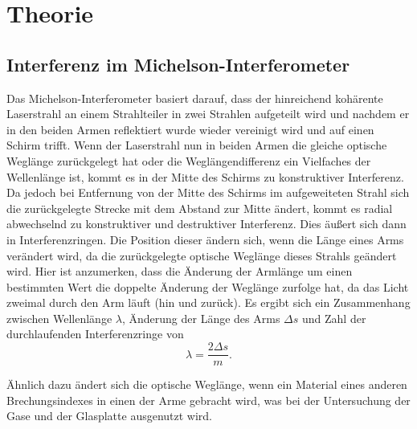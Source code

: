 \documentclass[
	a4paper,
	12pt,
	pagesize,
	ngerman
]{scrartcl}
\begin{document}
	\section{Theorie}
	\subsection{Interferenz im Michelson-Interferometer}
	Das Michelson-Interferometer basiert darauf, dass der hinreichend kohärente Laserstrahl an einem Strahlteiler in zwei Strahlen aufgeteilt wird und nachdem er in den beiden Armen reflektiert wurde wieder vereinigt wird und auf einen Schirm trifft.
	Wenn der Laserstrahl nun in beiden Armen die gleiche optische Weglänge zurückgelegt hat oder die Weglängendifferenz ein Vielfaches der Wellenlänge ist, kommt es in der Mitte des Schirms zu konstruktiver Interferenz.
	Da jedoch bei Entfernung von der Mitte des Schirms im aufgeweiteten Strahl sich die zurückgelegte Strecke mit dem Abstand zur Mitte ändert, kommt es radial abwechselnd zu konstruktiver und destruktiver Interferenz.
	Dies äußert sich dann in Interferenzringen.
	Die Position dieser ändern sich, wenn die Länge eines Arms verändert wird, da die zurückgelegte optische Weglänge dieses Strahls geändert wird.
	Hier ist anzumerken, dass die Änderung der Armlänge um einen bestimmten Wert die doppelte Änderung der Weglänge zurfolge hat, da das Licht zweimal durch den Arm läuft (hin und zurück).
	Es ergibt sich ein Zusammenhang zwischen Wellenlänge $\lambda$, Änderung der Länge des Arms $\Delta s$ und Zahl der durchlaufenden Interferenzringe von %
	\begin{equation}
		\lambda = \frac{2 \Delta s}{m}.
		\label{eq_wellenlaenge}
	\end{equation}

	Ähnlich dazu ändert sich die optische Weglänge, wenn ein Material eines anderen Brechungsindexes in einen der Arme gebracht wird, was bei der Untersuchung der Gase und der Glasplatte ausgenutzt wird.
\end{document}
